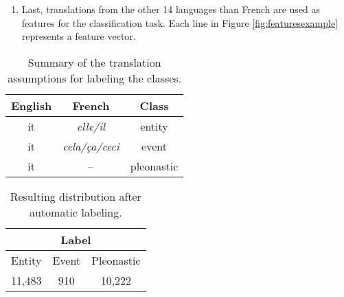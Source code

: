 \documentclass[10pt, a4paper]{article} \usepackage{lrec} \usepackage{multibib}
\begin{document}
\begin{enumerate}
\item Last, translations from the other 14 languages than French are used as features for
the classification task. Each line in Figure \ref{fig:featuresexample}
represents a feature vector.

\end{enumerate}




\begin{table}\centering \begin{tabular}{ccc} \toprule \textbf{English} &
\textbf{French} &  \textbf{Class} \\ \midrule it &  \textit{elle/il}  & entity\\
it & \textit{cela/ça/ceci} & event  \\ it  &  -- &pleonastic \\
\bottomrule
\end{tabular} 
\caption{Summary of the translation assumptions for labeling the
classes. }\label{tab:classrules} 
\end{table}



\begin{table}[h!]\centering \begin{tabular}{ccc}
\multicolumn{3}{c}{\textbf{Label}}\\ 
\toprule 
Entity & Event & Pleonastic \\
\midrule 
11,483 & 910 &10,222\\ 
\bottomrule 
\end{tabular} 
\caption{Resulting distribution after automatic labeling. }
\label{tab:resultinglabels} 
\end{table}
\end{document}
